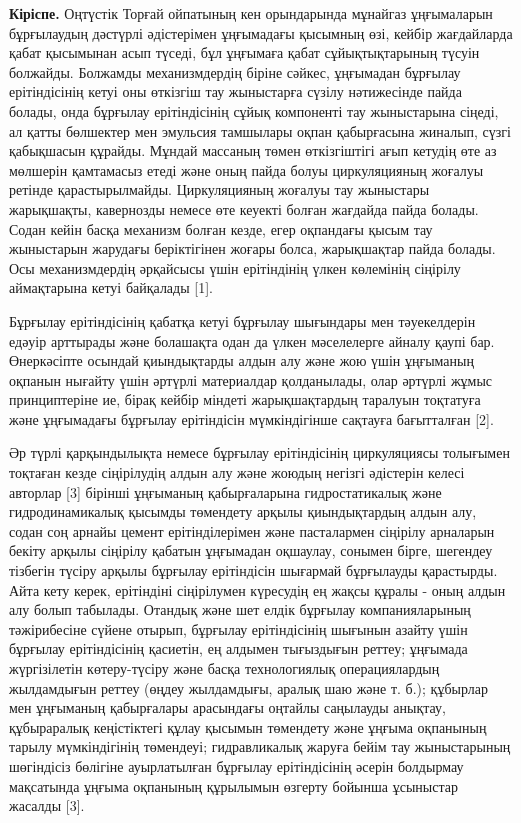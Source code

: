 \begin{multicols}{2}
{\bfseries Кіріспе.} Оңтүстік Торғай ойпатының кен орындарында мұнайгаз
ұңғымаларын бұрғылаудың дәстүрлі әдістерімен ұңғымадағы қысымның өзі,
кейбір жағдайларда қабат қысымынан асып түседі, бұл ұңғымаға қабат
сұйықтықтарының түсуін болжайды. Болжамды механизмдердің біріне сәйкес,
ұңғымадан бұрғылау ерітіндісінің кетуі оны өткізгіш тау жыныстарға
сүзілу нәтижесінде пайда болады, онда бұрғылау ерітіндісінің сұйық
компоненті тау жыныстарына сіңеді, ал қатты бөлшектер мен эмульсия
тамшылары оқпан қабырғасына жиналып, сүзгі қабықшасын құрайды. Мұндай
массаның төмен өткізгіштігі ағып кетудің өте аз мөлшерін қамтамасыз
етеді және оның пайда болуы циркуляцияның жоғалуы ретінде
қарастырылмайды. Циркуляцияның жоғалуы тау жыныстары жарықшақты,
кавернозды немесе өте кеуекті болған жағдайда пайда болады. Содан кейін
басқа механизм болған кезде, егер оқпандағы қысым тау жыныстарын
жарудағы беріктігінен жоғары болса, жарықшақтар пайда болады. Осы
механизмдердің әрқайсысы үшін ерітіндінің үлкен көлемінің сіңірілу
аймақтарына кетуі байқалады {[}1{]}.

Бұрғылау ерітіндісінің қабатқа кетуі бұрғылау шығындары мен тәуекелдерін
едәуір арттырады және болашақта одан да үлкен мәселелерге айналу қаупі
бар. Өнеркәсіпте осындай қиындықтарды алдын алу және жою үшін ұңғыманың
оқпанын нығайту үшін әртүрлі материалдар қолданылады, олар әртүрлі жұмыс
принциптеріне ие, бірақ кейбір міндеті жарықшақтардың таралуын тоқтатуға
және ұңғымадағы бұрғылау ерітіндісін мүмкіндігінше сақтауға бағытталған
{[}2{]}.

Әр түрлі қарқындылықта немесе бұрғылау ерітіндісінің циркуляциясы
толығымен тоқтаған кезде сіңірілудің алдын алу және жоюдың негізгі
әдістерін келесі авторлар {[}3{]} бірінші ұңғыманың қабырғаларына
гидростатикалық және гидродинамикалық қысымды төмендету арқылы
қиындықтардың алдын алу, содан соң арнайы цемент ерітінділерімен және
пасталармен сіңірілу арналарын бекіту арқылы сіңірілу қабатын ұңғымадан
оқшаулау, сонымен бірге, шегендеу тізбегін түсіру арқылы бұрғылау
ерітіндісін шығармай бұрғылауды қарастырды. Айта кету керек, ерітіндіні
сіңірілумен күресудің ең жақсы құралы - оның алдын алу болып табылады.
Отандық және шет елдік бұрғылау компанияларының тәжірибесіне сүйене
отырып, бұрғылау ерітіндісінің шығынын азайту үшін бұрғылау
ерітіндісінің қасиетін, ең алдымен тығыздығын реттеу; ұңғымада
жүргізілетін көтеру-түсіру және басқа технологиялық операциялардың
жылдамдығын реттеу (өңдеу жылдамдығы, аралық шаю және т. б.); құбырлар
мен ұңғыманың қабырғалары арасындағы оңтайлы саңылауды анықтау,
құбыраралық кеңістіктегі құлау қысымын төмендету және ұңғыма оқпанының
тарылу мүмкіндігінің төмендеуі; гидравликалық жаруға бейім тау
жыныстарының шөгіндісіз бөлігіне ауырлатылған бұрғылау ерітіндісінің
әсерін болдырмау мақсатында ұңғыма оқпанының құрылымын өзгерту бойынша
ұсыныстар жасалды {[}3{]}.


\end{multicols}

